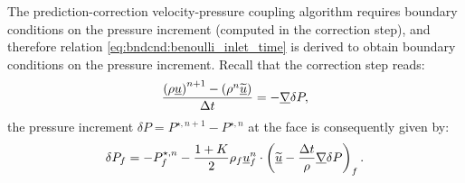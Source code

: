 The prediction-correction velocity-pressure coupling algorithm requires boundary conditions on the pressure increment
(computed in the correction step), and therefore
relation \eqref{eq:bndcnd:benoulli_inlet_time} is derived to obtain boundary conditions on the pressure increment. Recall that the
correction step reads:
 \begin{equation}\label{eq:bndcnd:correction_step}
\dfrac{\left( \rho \underline{u} \right)^{n+1} - \left( \rho^n \widetilde{\underline{u}} \right)}{\Delta t} = - \underline{\nabla} \delta P,
\end{equation}
the pressure increment $ \delta P = P^{\star, n+1} - P^{\star, n}$ at the face is consequently given by:
 \begin{equation}\label{eq:bndcnd:pressure_increment}
\delta P_{f} = -P^{\star, n}_{f} - \dfrac{1+K}{2} \rho_{f} \underline{u}^{n}_{f} \cdot \left( \widetilde{\underline{u}} - \dfrac{\Delta t}{\rho} \underline{\nabla} \delta P \right)_{f}.
\end{equation}


